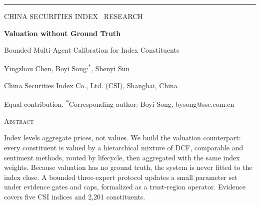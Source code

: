 \documentclass[10pt]{article}
\renewcommand{\Huge}{\fontsize{80}{86}\selectfont}
\newcommand{\kickerfont}{\fontsize{21}{25}\selectfont\addfontfeatures{LetterSpace=16}}
\begin{document}
\vspace*{14mm}
\noindent\hspace*{24mm}%
\begin{minipage}[t]{793mm}
{\color{gold}\rule{\linewidth}{1.1pt}}\par
\vspace{4.5mm}

\begin{minipage}[t]{450mm}
  {\kickerfont\color{burgundy}CHINA SECURITIES INDEX \textperiodcentered\ RESEARCH}\par
  \vspace{4mm}
  {\Huge\bfseries\color{oxford}Valuation without Ground Truth}\par
  \vspace{2.5mm}
  {\fontsize{37}{43}\selectfont\color{oxford}Bounded Multi-Agent Calibration for Index Constituents}\par
  \vspace{5.5mm}
  {\fontsize{27}{32}\selectfont\color{ink}%
    Yingzhou Chen\textsuperscript{\dag},\enspace
    Boyi Song\textsuperscript{\dag,$\ast$},\enspace
    Shenyi Sun\textsuperscript{\dag}}\par
  \vspace{3mm}
  {\fontsize{23}{27}\selectfont\color{ink}%
    China Securities Index Co., Ltd. (CSI), Shanghai, China}\par
  \vspace{2mm}
  {\fontsize{19}{23}\selectfont\color{stone}%
    \textsuperscript{\dag}Equal contribution.\enspace
    \textsuperscript{$\ast$}Corresponding author: Boyi Song, bysong@sse.com.cn}\par
\end{minipage}%
\hfill
\begin{minipage}[t]{318mm}\RaggedRight
  {\fontsize{20}{24}\selectfont\color{burgundy}\scshape{}Abstract}\par
  \vspace{2.4mm}
  {\fontsize{20}{25}\selectfont\color{ink}%
  Index levels aggregate prices, not values. We build the valuation counterpart:
  every constituent is valued by a hierarchical mixture of DCF, comparable and
  sentiment methods, routed by lifecycle, then aggregated with the same index
  weights. Because valuation has no ground truth, the system is never fitted to
  the index close. A bounded three-expert protocol updates a small parameter set
  under evidence gates and caps, formalized as a trust-region operator. Evidence
  covers five CSI indices and 2,201 constituents.}\par
\end{minipage}


\end{minipage}
\end{document}
